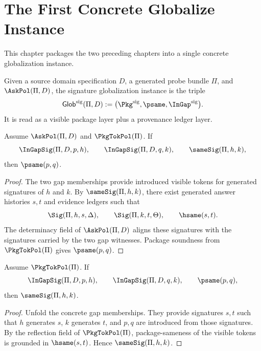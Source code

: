 \chapter{The First Concrete Globalize Instance}
\label{ch:concrete-instances-globalize}

This chapter packages the two preceding chapters into a single concrete globalization instance.

\begin{definition}
Given a source domain specification \(D\), a generated probe bundle \(\Pi\), and \(\AskPol(\Pi,D)\), the signature globalization instance is the triple
\[
  \mathsf{Glob}^{\mathrm{sig}}(\Pi,D)
  :=
  \bigl(\Pkg^{\mathrm{sig}},\psame,\InGap^{\mathrm{sig}}\bigr).
\]
It is read as a visible package layer plus a provenance ledger layer.
\end{definition}

\begin{theorem}
\label{thm:concrete-globalize-soundness}
Assume \(\AskPol(\Pi,D)\) and \(\PkgTokPol(\Pi)\). If
$$
  \InGapSig(\Pi,D,p,h),
  \qquad
  \InGapSig(\Pi,D,q,k),
  \qquad
  \sameSig(\Pi,h,k),
$$
then \(\psame(p,q)\).
\end{theorem}
\begin{proof}
The two gap memberships provide introduced visible tokens for generated signatures of \(h\) and \(k\). By \(\sameSig(\Pi,h,k)\), there exist generated answer histories \(s,t\) and evidence ledgers such that
$$
  \Sig(\Pi,h,s,\Delta),\qquad \Sig(\Pi,k,t,\Theta),\qquad \hsame(s,t).
$$
The determinacy field of \(\AskPol(\Pi,D)\) aligns these signatures with the signatures carried by the two gap witnesses. Package soundness from \(\PkgTokPol(\Pi)\) gives \(\psame(p,q)\).
\end{proof}

\begin{theorem}
\label{thm:concrete-globalization-completeness}
Assume \(\PkgTokPol(\Pi)\). If
$$
  \InGapSig(\Pi,D,p,h),
  \qquad
  \InGapSig(\Pi,D,q,k),
  \qquad
  \psame(p,q),
$$
then \(\sameSig(\Pi,h,k)\).
\end{theorem}
\begin{proof}
Unfold the concrete gap memberships. They provide signatures \(s,t\) such that \(h\) generates \(s\), \(k\) generates \(t\), and \(p,q\) are introduced from those signatures. By the reflection field of \(\PkgTokPol(\Pi)\), package-sameness of the visible tokens is grounded in \(\hsame(s,t)\). Hence \(\sameSig(\Pi,h,k)\).
\end{proof}


